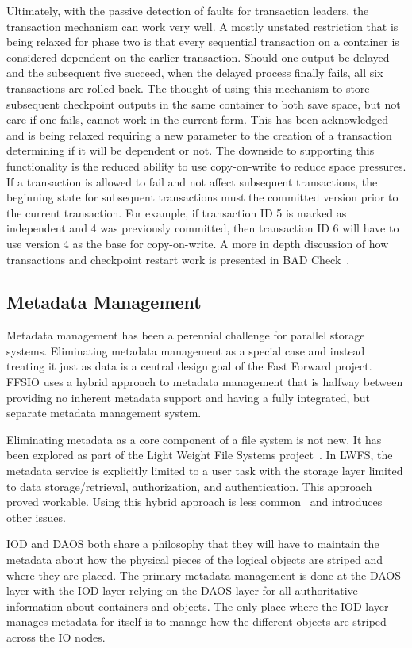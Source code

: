 \documentclass[conference]{IEEEtran} \pdfpagewidth=8.5in
\begin{document}
Ultimately, with the passive detection of faults for transaction leaders, the
transaction mechanism can work very well. A mostly unstated restriction that is
being relaxed for phase two is that every sequential transaction on a container
is considered dependent on the earlier transaction. Should one output be
delayed and the subsequent five succeed, when the delayed process finally
fails, all six transactions are rolled back. The thought of using this
mechanism to store subsequent checkpoint outputs in the same container to both
save space, but not care if one fails, cannot work in the current form. This
has been acknowledged and is being relaxed requiring a new parameter to the
creation of a transaction determining if it will be dependent or not. The
downside to supporting this functionality is the reduced ability to use
copy-on-write to reduce space pressures. If a transaction is allowed to fail
and not affect subsequent transactions, the beginning state for subsequent
transactions must the committed version prior to the current transaction. For
example, if transaction ID 5 is marked as independent and 4 was previously
committed, then transaction ID 6 will have to use version 4 as the base for
copy-on-write.  A more in depth discussion of how transactions and checkpoint
restart work is presented in BAD Check~\cite{bent:2015:pdsw}.

\subsection{Metadata Management}
Metadata management has been a perennial challenge for parallel storage
systems.  Eliminating metadata management as a special case and instead
treating it just as data is a central design goal of the Fast Forward project.
FFSIO uses a hybrid approach to metadata management that is halfway between
providing no inherent metadata support and having a fully integrated, but
separate metadata management system.

Eliminating metadata as a core component of a file system is not new. It has
been explored as part of the Light Weight File Systems
project~\cite{oldfield:lwfs}. In LWFS, the metadata service is explicitly
limited to a user task with the storage layer limited to data
storage/retrieval, authorization, and authentication. This approach proved
workable. Using this hybrid approach is less common~\cite{weil:2006:ceph} and
introduces other issues.

IOD and DAOS both share a philosophy that they will have to maintain the
metadata about how the physical pieces of the logical objects are striped and
where they are placed. The primary metadata management is done at the DAOS
layer with the IOD layer relying on the DAOS layer for all authoritative
information about containers and objects. The only place where the IOD layer
manages metadata for itself is to manage how the different objects are striped
across the IO nodes.
\end{document}
